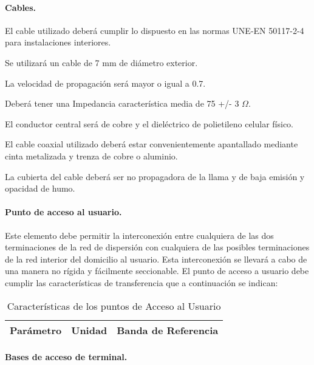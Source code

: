 \paragraph{Cables.}

El cable utilizado deberá cumplir lo dispuesto en las normas UNE-EN 50117-2-4 para instalaciones interiores.

Se utilizará un cable de 7 mm de diámetro exterior.

La velocidad de propagación será mayor o igual a 0.7.

Deberá tener una Impedancia característica media de 75 +/- 3 $\Omega$.

El conductor central será de cobre y el dieléctrico de polietileno celular físico. 

El cable coaxial utilizado deberá estar convenientemente apantallado mediante cinta metalizada y trenza de cobre o aluminio. 

La cubierta del cable deberá ser no propagadora de la llama y de baja emisión y opacidad de humo.

\paragraph{Punto de acceso al usuario.}

Este elemento debe permitir la interconexión entre cualquiera de las dos terminaciones de la red de dispersión con cualquiera de las posibles terminaciones de la red interior del domicilio al usuario. Esta interconexión se llevará a cabo de una manera no rígida y fácilmente seccionable. El punto de acceso a usuario debe cumplir las características de transferencia que a continuación se indican:

\begin{table}[H]
\caption{Características de los puntos de Acceso al Usuario}
\centering
\label{caracPAUs}
\begin{tabular}{l l l}
    Parámetro & Unidad & Banda de Referencia\\
\hline
\hline
    
\end{tabular}
\end{table}


\paragraph{Bases de acceso de terminal.}